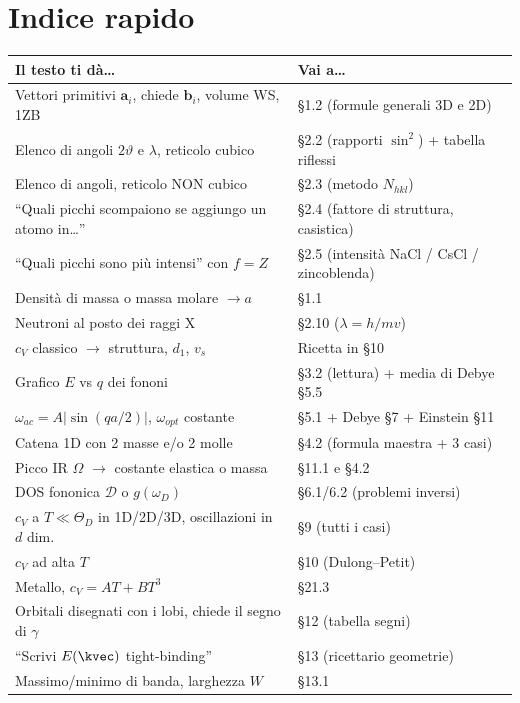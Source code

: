 \section{Indice rapido}
\begin{center}
\renewcommand{\arraystretch}{1.35}
{\small
\begin{tabular}{p{7.4cm} p{9.6cm}}
\toprule
\textbf{Il testo ti dà\dots} & \textbf{Vai a\dots} \\
\midrule
Vettori primitivi $\mathbf{a}_i$, chiede $\mathbf{b}_i$, volume WS, 1ZB & §1.2 (formule generali 3D e 2D)  \\
Elenco di angoli $2\vartheta$ e $\lambda$, reticolo cubico & §2.2 (rapporti $\sin^2$) + tabella riflessi  \\
Elenco di angoli, reticolo NON cubico & §2.3 (metodo $N_{hkl}$)  \\
``Quali picchi scompaiono se aggiungo un atomo in\dots'' & §2.4 (fattore di struttura, casistica)  \\
``Quali picchi sono più intensi'' con $f=Z$ & §2.5 (intensità NaCl / CsCl / zincoblenda)  \\
Densità di massa o massa molare $\to a$ & §1.1  \\
Neutroni al posto dei raggi X & §2.10 ($\lambda = h/mv$)  \\
$c_V$ classico $\to$ struttura, $d_1$, $v_s$ & Ricetta in §10  \\
Grafico $E$ vs $q$ dei fononi & §3.2 (lettura) + media di Debye §5.5  \\
$\omega_{ac}=A|\sin(qa/2)|$, $\omega_{opt}$ costante & §5.1 + Debye §7 + Einstein §11  \\
Catena 1D con 2 masse e/o 2 molle & §4.2 (formula maestra + 3 casi)  \\
Picco IR $\Omega$ $\to$ costante elastica o massa & §11.1 e §4.2  \\
DOS fononica $\mathcal{D}$ o $g(\omega_D)$ & §6.1/6.2 (problemi inversi)  \\
$c_V$ a $T\ll\Theta_D$ in 1D/2D/3D, oscillazioni in $d$ dim.\ & §9 (tutti i casi)  \\
$c_V$ ad alta $T$ & §10 (Dulong--Petit)  \\
Metallo, $c_V = AT+BT^3$ & §21.3  \\
\midrule
Orbitali disegnati con i lobi, chiede il segno di $\gamma$ & §12 (tabella segni)  \\
``Scrivi $E(\kvec)$ tight-binding'' & §13 (ricettario geometrie)  \\
Massimo/minimo di banda, larghezza $W$ & §13.1  \\

\end{tabular}}
\end{center}
